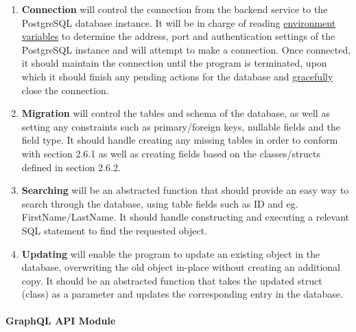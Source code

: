 \documentclass[../../main.tex]{subfiles}
\begin{document}
\begin{enumerate}
    \item \textbf{Connection} will control the connection from the
          backend service to the PostgreSQL database instance. It will be in charge
          of reading \underline{environment variables} to determine
          the address, port and authentication settings of the PostgreSQL
          instance and will attempt to make a connection. Once connected,
          it should maintain the connection until the program is terminated,
          upon which it should finish any pending actions for the database
          and \underline{gracefully} close the connection.

    \item \textbf{Migration} will control the tables and schema of the
          database, as well as setting any constraints such as
          primary/foreign keys, nullable fields and the field type.
          It should handle creating any missing tables in order to conform
          with section 2.6.1 as well as creating fields based on the
          classes/structs defined in section 2.6.2.

    \item \textbf{Searching} will be an abstracted function that should
          provide an easy way to search through the database, using table fields
          such as ID and eg. FirstName/LastName. It should handle constructing
          and executing a relevant SQL statement to find the requested object.

    \item \textbf{Updating} will enable the program to update an existing
          object in the database, overwriting the old object in-place without creating
          an additional copy. It should be an abstracted function that takes the updated
          struct (class) as a parameter and updates the corresponding entry in the database.

\end{enumerate}

\paragraph{GraphQL API Module}

\paragraph{} %
\end{document}
